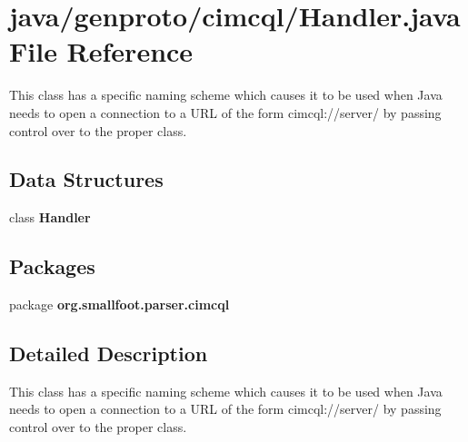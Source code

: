 \section{java/genproto/cimcql/\+Handler.java File Reference}
\label{cimcql_2Handler_8java}


This class has a specific naming scheme which causes it to be used when Java needs to open a connection to a U\+R\+L of the form cimcql\+://server/ by passing control over to the proper class.  


\subsection*{Data Structures}
\begin{DoxyCompactItemize}
\item 
class {\bf Handler}
\end{DoxyCompactItemize}
\subsection*{Packages}
\begin{DoxyCompactItemize}
\item 
package {\bf org.\+smallfoot.\+parser.\+cimcql}
\end{DoxyCompactItemize}


\subsection{Detailed Description}
This class has a specific naming scheme which causes it to be used when Java needs to open a connection to a U\+R\+L of the form cimcql\+://server/ by passing control over to the proper class. 

